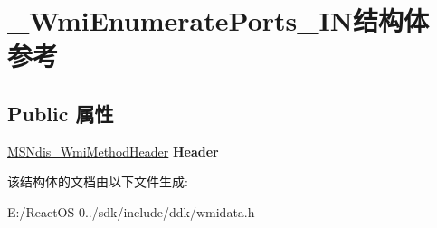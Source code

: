 \hypertarget{struct___wmi_enumerate_ports___i_n}{}\section{\+\_\+\+Wmi\+Enumerate\+Ports\+\_\+\+I\+N结构体 参考}
\label{struct___wmi_enumerate_ports___i_n}
\subsection*{Public 属性}
\begin{DoxyCompactItemize}
\item 
\mbox{\label{struct___wmi_enumerate_ports___i_n_a20954340f975891ca3fcb7c58622b79a}} 
\hyperlink{struct___m_s_ndis___wmi_method_header}{M\+S\+Ndis\+\_\+\+Wmi\+Method\+Header} {\bfseries Header}
\end{DoxyCompactItemize}


该结构体的文档由以下文件生成\+:\begin{DoxyCompactItemize}
\item 
E\+:/\+React\+O\+S-\/0../sdk/include/ddk/wmidata.\+h\end{DoxyCompactItemize}
